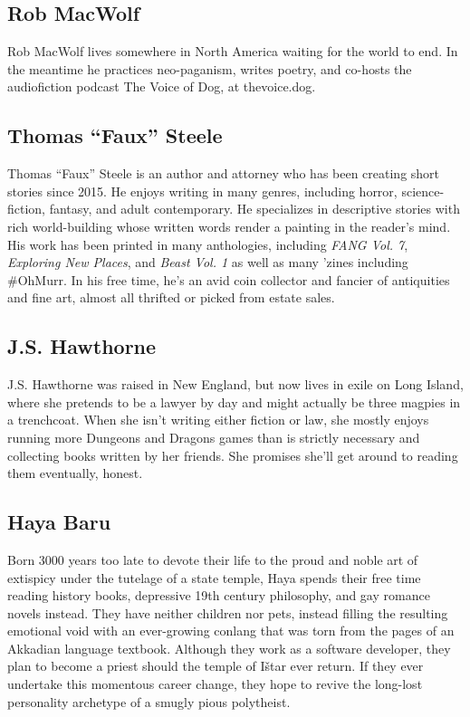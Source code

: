 \subsection*{Rob MacWolf}
Rob MacWolf lives somewhere in North America waiting for the world to end. In the meantime he practices neo-paganism, writes poetry, and co-hosts the audiofiction podcast The Voice of Dog, at thevoice.dog.

\subsection*{Thomas ``Faux'' Steele}
Thomas ``Faux'' Steele is an author and attorney who has been creating short stories since 2015. He enjoys writing in many genres, including horror, science-fiction, fantasy, and adult contemporary. He specializes in descriptive stories with rich world-building whose written words render a painting in the reader's mind. His work has been printed in many anthologies, including \emph{FANG Vol. 7}, \emph{Exploring New Places}, and \emph{Beast Vol. 1} as well as many 'zines including \#OhMurr. In his free time, he's an avid coin collector and fancier of antiquities and fine art, almost all thrifted or picked from estate sales.

\subsection*{J.S. Hawthorne}
J.S. Hawthorne was raised in New England, but now lives in exile on Long Island, where she pretends to be a lawyer by day and might actually be three magpies in a trenchcoat. When she isn't writing either fiction or law, she mostly enjoys running more Dungeons and Dragons games than is strictly necessary and collecting books written by her friends. She promises she'll get around to reading them eventually, honest.

\subsection*{Haya Baru}
Born 3000 years too late to devote their life to the proud and noble art of extispicy under the tutelage of a state temple, Haya spends their free time reading history books, depressive 19th century philosophy, and gay romance novels instead. They have neither children nor pets, instead filling the resulting emotional void with an ever-growing conlang that was torn from the pages of an Akkadian language textbook. Although they work as a software developer, they plan to become a priest should the temple of Ištar ever return. If they ever undertake this momentous career change, they hope to revive the long-lost personality archetype of a smugly pious polytheist.

